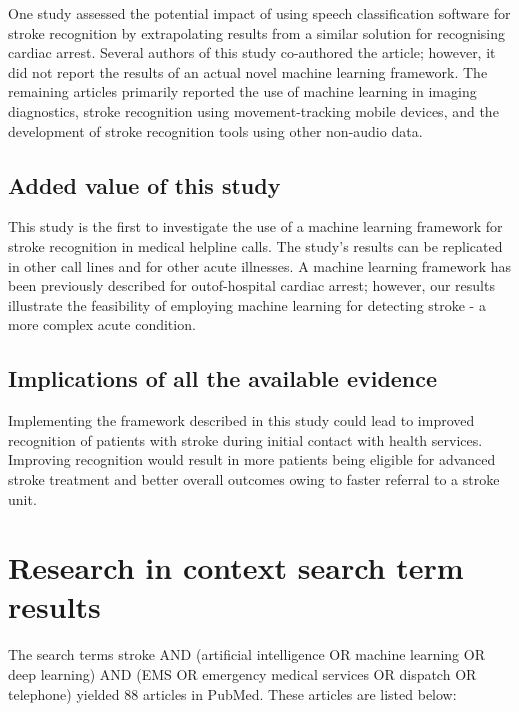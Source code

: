 {One study assessed the potential impact of using speech classification software for stroke recognition by extrapolating results from a similar solution for recognising cardiac arrest. Several authors of this study co-authored the article; however, it did not report the results of an actual novel machine learning framework. The remaining articles primarily reported the use of machine learning in imaging diagnostics, stroke recognition using movement-tracking mobile devices, and the development of stroke recognition tools using other non-audio data.

\subsection{Added value of this study}

This study is the first to investigate the use of a machine learning framework for stroke recognition in medical helpline calls. The study's results can be replicated in other call lines and for other acute illnesses. A machine learning framework has been previously described for outof-hospital cardiac arrest; however, our results illustrate the feasibility of employing machine learning for detecting stroke - a more complex acute condition.

\subsection{Implications of all the available evidence}

Implementing the framework described in this study could lead to improved recognition of patients with stroke during initial contact with health services. Improving recognition would result in more patients being eligible for advanced stroke treatment and better overall outcomes owing to faster referral to a stroke unit.


\section{Research in context search term results}
The search terms stroke AND (artificial intelligence OR machine learning OR deep learning) AND (EMS OR emergency medical services OR dispatch OR telephone) yielded 88 articles in PubMed. These articles are listed below:

}
